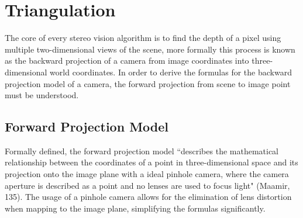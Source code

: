 \documentclass[11pt]{scrartcl}
\begin{document}
\section{Triangulation}

The core of every stereo vision algorithm is to find the depth of a pixel using multiple two-dimensional views of the scene, more formally this process is known as the backward projection of a camera from image coordinates into three-dimensional world coordinates. In order to derive the formulas for the backward projection model of a camera, the forward projection from scene to image point must be understood. 
\subsection{Forward Projection Model}

Formally defined, the forward projection model ``describes the mathematical relationship
between the coordinates of a point in three-dimensional space and its projection onto the image plane with a ideal pinhole camera, where the camera aperture is described as a point and no lenses are used to focus light" (Maamir, 135). The usage of a pinhole camera allows
for the elimination of lens distortion when mapping to the image plane, simplifying the formulas significantly.
\end{document}
